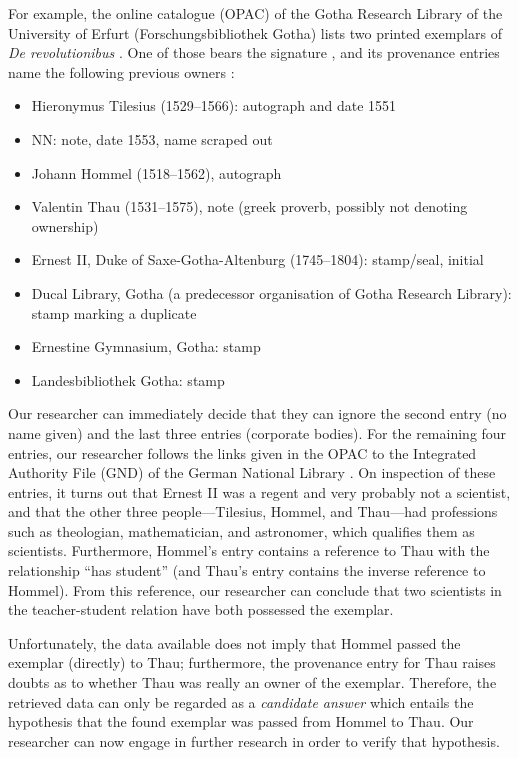 For example, the online catalogue (OPAC) of the Gotha Research Library of the University of Erfurt (Forschungsbibliothek Gotha) lists two printed exemplars
of \emph{De revolutionibus} \autocite{OPACDeRev}.
One of those bears the signature , and its provenance entries name the following previous owners  \autocite{OPACDeRevPPN}:
%
\begin{itemize}
  \item
    Hieronymus Tilesius (1529–1566): autograph and date 1551
  \item
    NN: note, date 1553, name scraped out
  \item
    Johann Hommel (1518–1562), autograph
  \item
    Valentin Thau (1531–1575), note (greek proverb, possibly not denoting ownership)
  \item
    Ernest II, Duke of Saxe-Gotha-Altenburg (1745–1804): stamp/seal, initial
  \item
    Ducal Library, Gotha (a predecessor organisation of Gotha Research Library): stamp marking a duplicate
  \item
    Ernestine Gymnasium, Gotha: stamp
  \item
    Landesbibliothek Gotha: stamp
\end{itemize}
%
Our researcher can immediately decide that they can ignore the second entry (no name given) and the last three entries (corporate bodies).
For the remaining four entries, our researcher follows the links given in the OPAC to the Integrated Authority File (GND) of the German National Library \autocite{DNBCatalogue}.
On inspection of these entries, it turns out that Ernest II was a regent and very probably not a scientist,
and that the other three people---Tilesius, Hommel, and Thau---had professions such as theologian,
mathematician, and astronomer, which qualifies them as scientists. Furthermore, Hommel's entry
contains a reference to Thau with the relationship \enquote{has student}
(and Thau's entry contains the inverse reference to Hommel).
From this reference, our researcher can conclude that two scientists in the teacher-student relation
have both possessed the exemplar. 

Unfortunately, the data available does not imply that Hommel passed the exemplar (directly) to Thau;
furthermore, the provenance entry for Thau raises doubts as to whether Thau was really an owner of the exemplar.
Therefore, the retrieved data can only be regarded as a \emph{candidate answer}
which entails the hypothesis that the found exemplar was passed from Hommel to Thau.
Our researcher can now engage in further research in order to verify that hypothesis.


